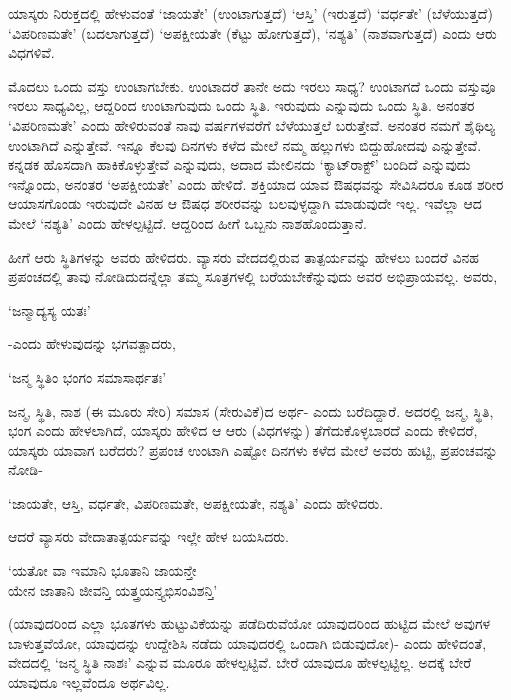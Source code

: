 ಯಾಸ್ಕರು ನಿರುಕ್ತದಲ್ಲಿ ಹೇಳುವಂತೆ `ಜಾಯತೇ' (ಉಂಟಾಗುತ್ತದೆ) `ಆಸ್ತಿ' (ಇರುತ್ತದೆ) `ವರ್ಧತೇ' (ಬೆಳೆಯುತ್ತದೆ) `ವಿಪರಿಣಮತೇ' (ಬದಲಾಗುತ್ತದೆ) `ಅಪಕ್ಷೀಯತೇ (ಕೆಟ್ಟು ಹೋಗುತ್ತದೆ), `ನಶ್ಯತಿ' (ನಾಶವಾಗುತ್ತದೆ) ಎಂದು ಆರು ವಿಧಗಳಿವೆ.

ಮೊದಲು ಒಂದು ವಸ್ತು ಉಂಟಾಗಬೇಕು. ಉಂಟಾದರೆ ತಾನೇ ಅದು ಇರಲು ಸಾಧ್ಯ? ಉಂಟಾಗದೆ ಒಂದು ವಸ್ತುವೂ ಇರಲು ಸಾಧ್ಯವಿಲ್ಲ, ಆದ್ದರಿಂದ ಉಂಟಾಗುವುದು ಒಂದು ಸ್ಥಿತಿ. ಇರುವುದು ಎನ್ನುವುದು ಒಂದು ಸ್ಥಿತಿ. ಅನಂತರ `ವಿಪರಿಣಮತೇ' ಎಂದು ಹೇಳಿರುವಂತೆ ನಾವು {} ವರ್ಷಗಳವರೆಗೆ ಬೆಳೆಯುತ್ತಲೆ ಬರುತ್ತೇವೆ. ಅನಂತರ ನಮಗೆ ಶೈಥಿಲ್ಯ ಉಂಟಾಗಿದೆ ಎನ್ನುತ್ತೇವೆ. ಇನ್ನೂ ಕೆಲವು ದಿನಗಳು ಕಳೆದ ಮೇಲೆ ನಮ್ಮ ಹಲ್ಲುಗಳು ಬಿದ್ದುಹೋದವು ಎನ್ನುತ್ತೇವೆ. ಕನ್ನಡಕ ಹೊಸದಾಗಿ ಹಾಕಿಕೊಳ್ಳುತ್ತೇವೆ ಎನ್ನುವುದು, ಅದಾದ ಮೇಲಿನದು `ಕ್ಯಾಟ್‌ರಾಕ್ಟ್' ಬಂದಿದೆ ಎನ್ನುವುದು ಇನ್ನೊಂದು, ಅನಂತರ `ಅಪಕ್ಷೀಯತೇ' ಎಂದು ಹೇಳಿದೆ. ಶಕ್ತಿಯಾದ ಯಾವ ಔಷಧವನ್ನು ಸೇವಿಸಿದರೂ ಕೂಡ ಶರೀರ ಆಯಾಸಗೊಂಡು ಇರುವುದೇ ವಿನಹ ಆ ಔಷಧ ಶರೀರವನ್ನು ಬಲವುಳ್ಳದ್ದಾಗಿ ಮಾಡುವುದೇ ಇಲ್ಲ. ಇವೆಲ್ಲಾ ಆದ ಮೇಲೆ `ನಶ್ಯತಿ' ಎಂದು ಹೇಳಲ್ಪಟ್ಟಿದೆ. ಆದ್ದರಿಂದ ಹೀಗೆ ಒಬ್ಬನು ನಾಶಹೊಂದುತ್ತಾನೆ.


ಹೀಗೆ ಆರು ಸ್ಥಿತಿಗಳನ್ನು ಅವರು ಹೇಳಿದರು. ವ್ಯಾಸರು ವೇದದಲ್ಲಿರುವ ತಾತ್ಪರ್ಯವನ್ನು ಹೇಳಲು ಬಂದರೆ ವಿನಹ ಪ್ರಪಂಚದಲ್ಲಿ ತಾವು ನೋಡಿದುದನ್ನೆಲ್ಲಾ ತಮ್ಮ ಸೂತ್ರಗಳಲ್ಲಿ ಬರೆಯಬೇಕೆನ್ನುವುದು ಅವರ ಅಭಿಪ್ರಾಯವಲ್ಲ. ಅವರು,


\begin{shloka}
`ಜನ್ಮಾದ್ಯಸ್ಯ ಯತಃ'
\end{shloka}

-ಎಂದು ಹೇಳುವುದನ್ನು ಭಗವತ್ಪಾದರು,

\begin{shloka}
`ಜನ್ಮ ಸ್ಥಿತಿಂ ಭಂಗಂ ಸಮಾಸಾರ್ಥತಃ'
\end{shloka}

ಜನ್ಮ, ಸ್ಥಿತಿ, ನಾಶ (ಈ ಮೂರು ಸೇರಿ) ಸಮಾಸ (ಸೇರುವಿಕೆ)ದ ಅರ್ಥ- ಎಂದು ಬರೆದಿದ್ದಾರೆ. ಅದರಲ್ಲಿ ಜನ್ಮ, ಸ್ಥಿತಿ, ಭಂಗ ಎಂದು ಹೇಳಲಾಗಿದೆ, ಯಾಸ್ಕರು ಹೇಳಿದ ಆ ಆರು (ವಿಧಗಳನ್ನು) ತೆಗೆದುಕೊಳ್ಳಬಾರದೆ ಎಂದು ಕೇಳಿದರೆ, ಯಾಸ್ಕರು ಯಾವಾಗ ಬರೆದರು? ಪ್ರಪಂಚ ಉಂಟಾಗಿ ಎಷ್ಟೋ ದಿನಗಳು ಕಳೆದ ಮೇಲೆ ಅವರು ಹುಟ್ಟಿ, ಪ್ರಪಂಚವನ್ನು ನೋಡಿ-

`ಜಾಯತೇ, ಆಸ್ತಿ, ವರ್ಧತೇ, ವಿಪರಿಣಮತೇ, ಅಪಕ್ಷೀಯತೇ, ನಶ್ಯತಿ' ಎಂದು ಹೇಳಿದರು.

ಆದರೆ ವ್ಯಾಸರು ವೇದಾತಾತ್ಪರ್ಯವನ್ನು ಇಲ್ಲೇ ಹೇಳ ಬಯಸಿದರು.

\begin{shloka}
`ಯತೋ ವಾ ಇಮಾನಿ ಭೂತಾನಿ ಜಾಯನ್ತೇ\\
ಯೇನ ಜಾತಾನಿ ಜೀವನ್ತಿ ಯತ್ತ್ರಯನ್ತ್ಯಭಿಸಂವಿಶನ್ತಿ'
\end{shloka}

(ಯಾವುದರಿಂದ ಎಲ್ಲಾ ಭೂತಗಳು ಹುಟ್ಟುವಿಕೆಯನ್ನು ಪಡೆದಿರುವೆಯೋ ಯಾವುದರಿಂದ ಹುಟ್ಟಿದ ಮೇಲೆ ಅವುಗಳ ಬಾಳುತ್ತವೆಯೋ, ಯಾವುದನ್ನು ಉದ್ದೇಶಿಸಿ ನಡೆದು ಯಾವುದರಲ್ಲಿ ಒಂದಾಗಿ ಬಿಡುವುದೋ)- ಎಂದು ಹೇಳಿದಂತೆ, ವೇದದಲ್ಲಿ `ಜನ್ಮ ಸ್ಥಿತಿ ನಾಶಃ' ಎನ್ನುವ ಮೂರೂ ಹೇಳಲ್ಪಟ್ಟಿವೆ. ಬೇರೆ ಯಾವುದೂ ಹೇಳಲ್ಪಟ್ಟಿಲ್ಲ. ಅದಕ್ಕೆ ಬೇರೆ ಯಾವುದೂ ಇಲ್ಲವೆಂದೂ ಅರ್ಥವಿಲ್ಲ.

